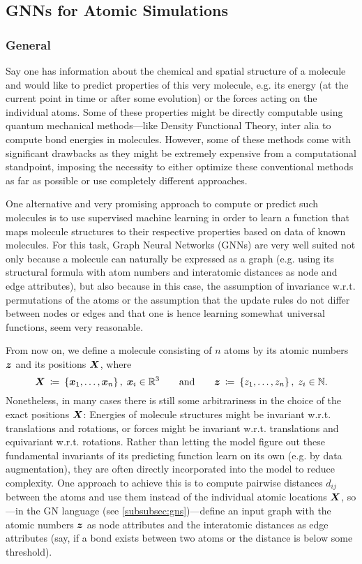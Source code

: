 \subsection{GNNs for Atomic Simulations}
\label{subsec:atomic-simulations}

\subsubsection{General}

Say one has information about the chemical and spatial structure of a molecule 
and would like to predict properties of this very molecule, e.g. its energy (at the 
current point in time or after some evolution) or the forces acting on the 
individual atoms. Some of these properties might be directly
computable using quantum mechanical methods---like Density Functional Theory, inter alia
to compute bond energies in molecules. However, some of these methods come
with significant drawbacks as they might be extremely expensive from a computational 
standpoint, imposing the necessity to either optimize these conventional methods 
as far as possible or use completely different approaches.

One alternative and very promising approach to compute or predict such molecules is to use supervised
machine learning in order to learn a function that maps molecule structures to their
respective properties based on data of known molecules. For this task, Graph
Neural Networks (GNNs) are very well suited not only because a molecule can naturally
be expressed as a graph (e.g. using its structural formula with atom numbers and
interatomic distances as node and edge attributes), but also because in this case, the 
assumption of invariance w.r.t. permutations of the atoms or the assumption that 
the update rules do not differ between nodes or edges and that one is hence
learning somewhat universal functions, seem very reasonable.

From now on, we define a molecule consisting of $n$ atoms by its atomic numbers 
$\boldsymbol{z}$ and its positions $\boldsymbol{X}$, where
\[
    \boldsymbol{X} \: \coloneqq \: \left\{\boldsymbol{x}_1, \dots, \boldsymbol{x}_n\right\}, \; \boldsymbol{x}_i \in \mathbb{R}^3
    \qquad \text{and} \qquad 
    \boldsymbol{z} \: \coloneqq \: \left\{z_1, \dots, z_n\right\}, \; z_i \in \mathbb{N} \text{.}
\]
Nonetheless, in many cases there is still some arbitrariness in the choice of the 
exact positions $\boldsymbol{X}$: Energies of molecule structures might be invariant w.r.t. 
translations and rotations, or forces might be invariant w.r.t. 
translations and equivariant w.r.t. rotations. Rather than letting the model figure out
these fundamental invariants of its predicting function learn on its own (e.g. by 
data augmentation), they are often directly incorporated into the model to reduce 
complexity. One approach to achieve this is to compute pairwise distances $d_{ij}$ 
between the atoms and use them instead of the individual atomic locations $\boldsymbol{X}$, 
so---in the GN language (see \ref{subsubsec:gns})---define an input graph with the atomic numbers $\boldsymbol{z}$ as 
node attributes and the interatomic distances as edge attributes (say, if a bond exists
between two atoms or the distance is below some threshold).




